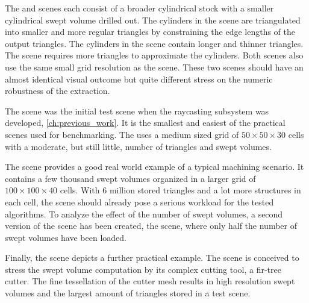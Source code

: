 The \cylinders and \cylindersd scenes each consist of a broader cylindrical stock with a smaller cylindrical swept volume drilled out.
The cylinders in the \cylindersd scene are triangulated into smaller and more regular triangles by constraining the edge lengths of the output triangles.
The cylinders in the \cylinders scene contain longer and thinner triangles.
The \cylindersd scene requires more triangles to approximate the cylinders.
Both scenes also use the same small grid resolution as the \cubes scene.
These two scenes should have an almost identical visual outcome but quite different stress on the numeric robustness of the extraction.

The \cylinderhead scene was the initial test scene when the raycasting subsystem was developed, \cf \cref{ch:previous_work}.
It is the smallest and easiest of the practical scenes used for benchmarking.
The \cylinderhead uses a medium sized grid of $50\times50\times30$ cells with a moderate, but still little, number of triangles and swept volumes.

The \impeller scene provides a good real world example of a typical machining scenario.
It contains a few thousand swept volumes organized in a larger grid of $100\times100\times40$ cells.
With 6 million stored triangles and a lot more structures in each cell, the \impeller scene should already pose a serious workload for the tested algorithms.
To analyze the effect of the number of swept volumes, a second version of the \impeller scene has been created, the \impellerhalf scene, where only half the number of swept volumes have been loaded.

Finally, the \turbine scene depicts a further practical example.
The scene is conceived to stress the swept volume computation by its complex cutting tool, a fir-tree cutter.
The fine tessellation of the cutter mesh results in high resolution swept volumes and the largest amount of triangles stored in a test scene.

